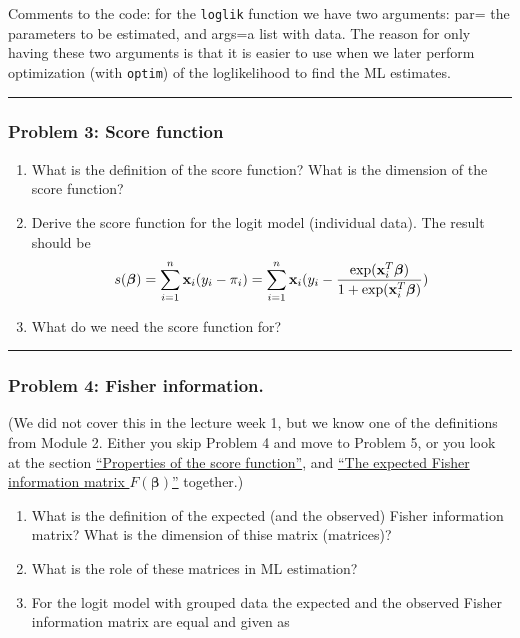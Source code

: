 \documentclass[
]{article}
\providecommand{\tightlist}{%
  \setlength{\itemsep}{0pt}\setlength{\parskip}{0pt}}
\begin{document}
Comments to the code: for the \texttt{loglik} function we have two
arguments: par= the parameters to be estimated, and args=a list with
data. The reason for only having these two arguments is that it is
easier to use when we later perform optimization (with \texttt{optim})
of the loglikelihood to find the ML estimates.

\begin{center}\rule{0.5\linewidth}{0.5pt}\end{center}

\hypertarget{problem-3-score-function}{%
\subsubsection{Problem 3: Score
function}\label{problem-3-score-function}}

\begin{enumerate}
\def\labelenumi{\alph{enumi})}
\tightlist
\item
  What is the definition of the score function? What is the dimension of
  the score function?
\item
  Derive the score function for the logit model (individual data). The
  result should be
  \[s(\boldsymbol{\beta})=\sum_{i=1}^n {\bf x}_i (y_i-\pi_i)=\sum_{i=1}^n {\bf x}_i (y_i-\frac{\exp({\bf x}_i^T\boldsymbol{\beta})}{1+\exp({\bf x}_i^T\boldsymbol{\beta})})\]
\item
  What do we need the score function for?
\end{enumerate}

\begin{center}\rule{0.5\linewidth}{0.5pt}\end{center}

\hypertarget{problem-4-fisher-information.}{%
\subsubsection{Problem 4: Fisher
information.}\label{problem-4-fisher-information.}}

(We did not cover this in the lecture week 1, but we know one of the
definitions from Module 2. Either you skip Problem 4 and move to Problem
5, or you look at the section \protect\hyperlink{propscore}{``Properties
of the score function''}, and \protect\hyperlink{covscore}{``The
expected Fisher information matrix \(F(\boldsymbol{\beta})\)''}
together.)

\begin{enumerate}
\def\labelenumi{\alph{enumi})}
\item
  What is the definition of the expected (and the observed) Fisher
  information matrix? What is the dimension of thise matrix (matrices)?
\item
  What is the role of these matrices in ML estimation?
\item
  For the logit model with grouped data the expected and the observed
  Fisher information matrix are equal and given as
\end{enumerate}
\end{document}
